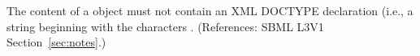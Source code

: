 The content of a \Notes object must not contain an XML
DOCTYPE declaration (i.e., a string beginning with the characters
.  (References: SBML L3V1 Section~\ref{sec:notes}.)
